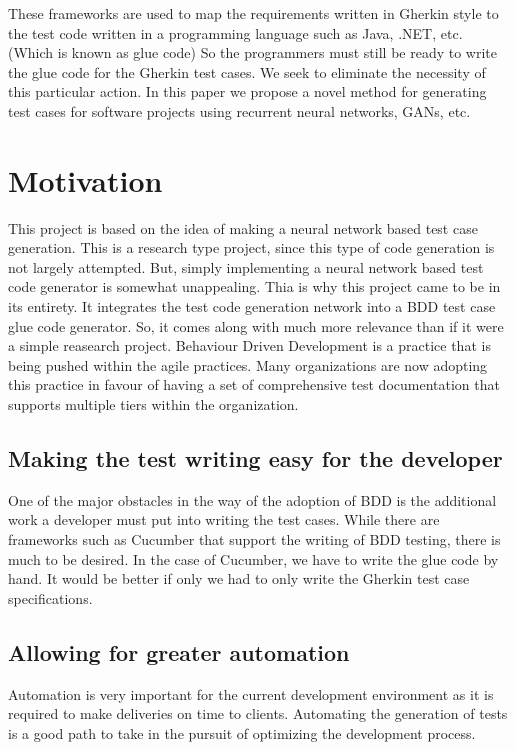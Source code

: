 \documentclass[conference, onecolumn, a4, 12pt]{IEEEtran}
\begin{document}
These frameworks are used to map the requirements written in Gherkin style to the test code written in a programming language such as Java, .NET, etc. (Which is known as glue code\cite{a2}) So the programmers must still be ready to write the glue code for the Gherkin test cases. We seek to eliminate the necessity of this particular action.
In this paper we propose a novel method for generating test cases for software projects using recurrent neural networks, GANs, etc.\newline

\section{Motivation}
This project is based on the idea of making a neural network based test case generation. This is a research type project, since this type of code generation is not largely attempted. But, simply implementing a neural network based test code generator is somewhat unappealing. Thia is why this project came to be in its entirety. It integrates the test code generation network into a BDD test case glue code generator. So, it comes along with much more relevance than if it were a simple reasearch project.\newline
Behaviour Driven Development is a practice that is being pushed within the agile practices. Many organizations are now adopting this practice in favour of having a set of comprehensive test documentation that supports multiple tiers within the organization.
\subsection{Making the test writing easy for the developer}
One of the major obstacles in the way of the adoption of BDD is the additional work a developer must put into writing the test cases. While there are frameworks such as Cucumber that support the writing of BDD testing, there is much to be desired. In the case of Cucumber, we have to write the glue code by hand. It would be better if only we had to only write the Gherkin test case specifications.
\subsection{Allowing for greater automation}
Automation is very important for the current development environment as it is required to make deliveries on time to clients. Automating the generation of tests is a good path to take in the pursuit of optimizing the development process.
\end{document}

